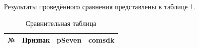 Результаты проведённого сравнения представлены в таблице \ref{rndhpcblo.0209}.

\begin{landscape}
  \begin{longtable}{|c|p{}|p{}|p{}|}
    \caption{Сравнительная таблица}\label{rndhpcblo.0209}                                                                                                                                                                                                                                                                                                                                                                                                                                                                                                                                                                                                                                                                                                                                                                                                                                                                                                                                                                                         \\
    \hline
    \textbf{№} & \textbf{Признак}                                                                           & \textbf{pSeven}                                                                                                                                                                                                                                                                                                                                                                                                                                                                                                                                                                                                                                 & \textbf{comsdk}                                                                                                                                                                                                                                                                   \\
    \hline

\end{longtable}
\end{landscape}
